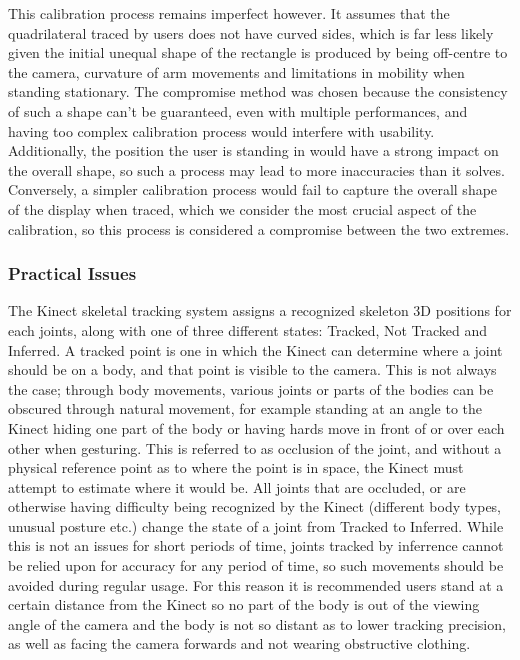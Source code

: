 
This calibration process remains imperfect however. It assumes that the quadrilateral traced by users does not have curved sides, which is far less likely given the initial unequal shape of the rectangle is produced by being off-centre to the camera, curvature of arm movements and limitations in mobility when standing stationary. The compromise method was chosen because the consistency of such a shape can't be guaranteed, even with multiple performances, and having too complex calibration process would interfere with usability. Additionally, the position the user is standing in would have a strong impact on the overall shape, so such a process may lead to more inaccuracies than it solves. Conversely, a simpler calibration process would fail to capture the overall shape of the display when traced, which we consider the most crucial aspect of the calibration, so this process is considered a compromise between the two extremes.

\subsubsection{Practical Issues}

The Kinect skeletal tracking system assigns a recognized skeleton 3D positions for each joints, along with one of three different states: Tracked, Not Tracked and Inferred. A tracked point is one in which the Kinect can determine where a joint should be on a body, and that point is visible to the camera. This is not always the case; through body movements, various joints or parts of the bodies can be obscured through natural movement, for example standing at an angle to the Kinect hiding one part of the body or having hards move in front of or over each other when gesturing. This is referred to as occlusion of the joint, and without a physical reference point as to where the point is in space, the Kinect must attempt to estimate where it would be. All joints that are occluded, or are otherwise having difficulty being recognized by the Kinect (different body types, unusual posture etc.) change the state of a joint from Tracked to Inferred. While this is not an issues for short periods of time, joints tracked by inferrence cannot be relied upon for accuracy for any period of time, so such movements should be avoided during regular usage. For this reason it is recommended users stand at a certain distance from the Kinect so no part of the body is out of the viewing angle of the camera and the body is not so distant as to lower tracking precision, as well as facing the camera forwards and not wearing obstructive clothing.

